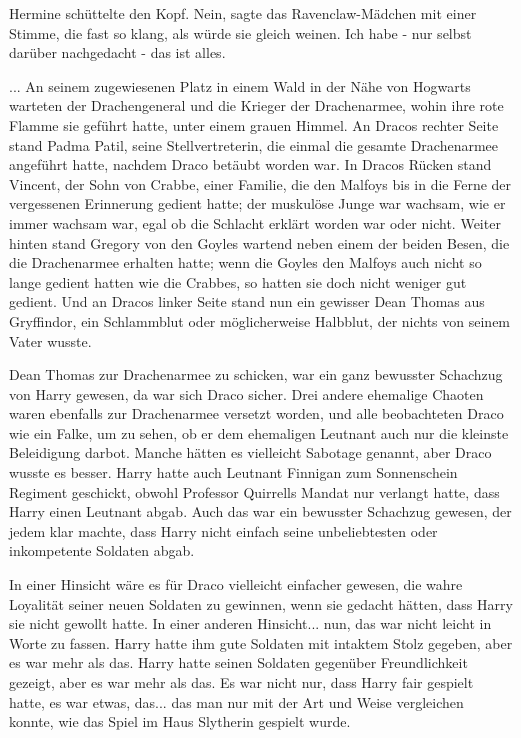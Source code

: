 Hermine schüttelte den Kopf. \glqq{}Nein\grqq{}, sagte das Ravenclaw-Mädchen mit
einer Stimme, die fast so klang, als würde sie gleich weinen. \glqq{}Ich habe -
nur selbst darüber nachgedacht - das ist alles.\grqq{}

... An seinem zugewiesenen Platz in einem Wald in der Nähe von Hogwarts warteten
der Drachengeneral und die Krieger der Drachenarmee, wohin ihre rote Flamme sie
geführt hatte, unter einem grauen Himmel. An Dracos rechter Seite stand Padma
Patil, seine Stellvertreterin, die einmal die gesamte Drachenarmee angeführt
hatte, nachdem Draco betäubt worden war. In Dracos Rücken stand Vincent, der
Sohn von Crabbe, einer Familie, die den Malfoys bis in die Ferne der vergessenen
Erinnerung gedient hatte; der muskulöse Junge war wachsam, wie er immer wachsam
war, egal ob die Schlacht erklärt worden war oder nicht. Weiter hinten stand
Gregory von den Goyles wartend neben einem der beiden Besen, die die
Drachenarmee erhalten hatte; wenn die Goyles den Malfoys auch nicht so lange
gedient hatten wie die Crabbes, so hatten sie doch nicht weniger gut gedient.
Und an Dracos linker Seite stand nun ein gewisser Dean Thomas aus Gryffindor,
ein Schlammblut oder möglicherweise Halbblut, der nichts von seinem Vater
wusste.

Dean Thomas zur Drachenarmee zu schicken, war ein ganz bewusster Schachzug von
Harry gewesen, da war sich Draco sicher. Drei andere ehemalige Chaoten waren
ebenfalls zur Drachenarmee versetzt worden, und alle beobachteten Draco wie ein
Falke, um zu sehen, ob er dem ehemaligen Leutnant auch nur die kleinste
Beleidigung darbot. Manche hätten es vielleicht Sabotage genannt, aber Draco
wusste es besser. Harry hatte auch Leutnant Finnigan zum Sonnenschein Regiment
geschickt, obwohl Professor Quirrells Mandat nur verlangt hatte, dass Harry
einen Leutnant abgab. Auch das war ein bewusster Schachzug gewesen, der jedem
klar machte, dass Harry nicht einfach seine unbeliebtesten oder inkompetente
Soldaten abgab.

In einer Hinsicht wäre es für Draco vielleicht einfacher gewesen, die wahre
Loyalität seiner neuen Soldaten zu gewinnen, wenn sie gedacht hätten, dass Harry
sie nicht gewollt hatte. In einer anderen Hinsicht... nun, das war nicht leicht
in Worte zu fassen. Harry hatte ihm gute Soldaten mit intaktem Stolz gegeben,
aber es war mehr als das. Harry hatte seinen Soldaten gegenüber Freundlichkeit
gezeigt, aber es war mehr als das. Es war nicht nur, dass Harry fair gespielt
hatte, es war etwas, das... das man nur mit der Art und Weise vergleichen
konnte, wie das Spiel im Haus Slytherin gespielt wurde.

